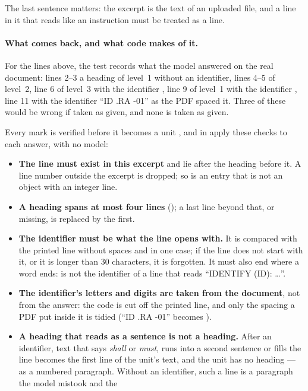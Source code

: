 The last sentence matters: the excerpt is the text of an uploaded file, and a line in it that
reads like an instruction must be treated as a line.

\paragraph{What comes back, and what code makes of it.} For the lines above, the test records
what the model answered on the real document: lines 2–3 a heading of level~1 without an
identifier, lines 4–5 of level~2, line 6 of level~3 with the identifier , line
9 of level~1 with the identifier , line 11 with the identifier
\enquote{ID .RA -01} as the PDF spaced it. Three of these would be wrong if taken as given,
and none is taken as given.

\begin{codebox}{Every mark is verified before it becomes a unit}
,  and  in  apply these
checks to each answer, with no model:
\begin{itemize}
  \item \textbf{The line must exist in this excerpt} and lie after the heading before it. A
    line number outside the excerpt is dropped; so is an entry that is not an object with an
    integer line.
  \item \textbf{A heading spans at most four lines} (); a last line
    beyond that, or missing, is replaced by the first.
  \item \textbf{The identifier must be what the line opens with.} It is compared with the
    printed line without spaces and in one case; if the line does not start with it, or it is
    longer than 30 characters, it is forgotten. It must also end where a word ends: 
    is not the identifier of a line that reads \enquote{IDENTIFY (ID): …}.
  \item \textbf{The identifier's letters and digits are taken from the document}, not from the
    answer: the code is cut off the printed line, and only the spacing a PDF put inside it is
    tidied (\enquote{ID .RA -01} becomes ).
  \item \textbf{A heading that reads as a sentence is not a heading.} After an identifier,
    text that says \emph{shall} or \emph{must}, runs into a second sentence or fills the line
    becomes the first line of the unit's text, and the unit has no heading --- as a numbered
    paragraph. Without an identifier, such a line is a paragraph the model mistook and the

\end{itemize}
\end{codebox}
